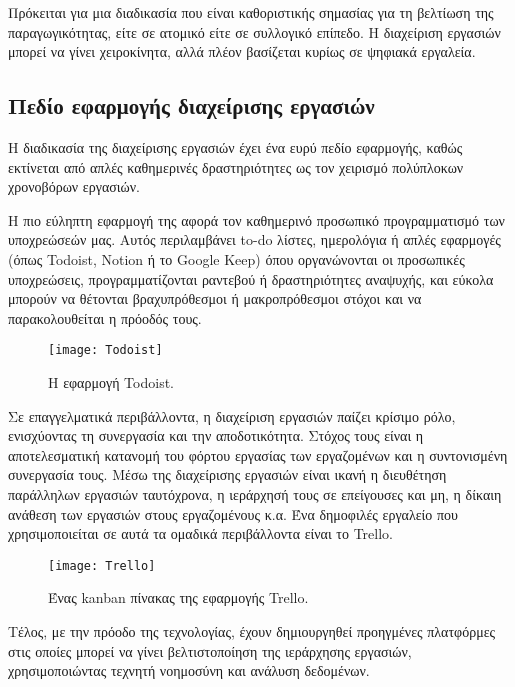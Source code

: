             Πρόκειται για μια διαδικασία που είναι καθοριστικής σημασίας για τη βελτίωση της παραγωγικότητας, είτε σε ατομικό είτε σε συλλογικό επίπεδο. Η διαχείριση εργασιών μπορεί να γίνει χειροκίνητα, αλλά πλέον βασίζεται κυρίως σε ψηφιακά εργαλεία.

        \subsection{Πεδίο εφαρμογής διαχείρισης εργασιών}
            Η διαδικασία της διαχείρισης εργασιών έχει ένα ευρύ πεδίο εφαρμογής, καθώς εκτίνεται από απλές καθημερινές δραστηριότητες ως τον χειρισμό πολύπλοκων χρονοβόρων εργασιών.

            Η πιο εύληπτη εφαρμογή της αφορά τον καθημερινό προσωπικό προγραμματισμό των υποχρεώσεών μας. Αυτός περιλαμβάνει to-do λίστες, ημερολόγια ή απλές εφαρμογές (όπως Todoist, Notion ή το Google Keep) όπου οργανώνονται οι προσωπικές υποχρεώσεις, προγραμματίζονται ραντεβού ή δραστηριότητες αναψυχής, και εύκολα μπορούν να θέτονται βραχυπρόθεσμοι ή μακροπρόθεσμοι στόχοι και να παρακολουθείται η πρόοδός τους. \cite{Todoist} \cite{Notion}

            \begin{figure}[h!] \noindent \centering
                \texttt{[image: Todoist]}
                \caption{Η εφαρμογή Todoist.}
            \end{figure}

            Σε επαγγελματικά περιβάλλοντα, η διαχείριση εργασιών παίζει κρίσιμο ρόλο, ενισχύοντας τη συνεργασία και την αποδοτικότητα. Στόχος τους είναι η αποτελεσματική κατανομή του φόρτου εργασίας των εργαζομένων και η συντονισμένη συνεργασία τους. Μέσω της διαχείρισης εργασιών είναι ικανή η διευθέτηση παράλληλων εργασιών ταυτόχρονα, η ιεράρχησή τους σε επείγουσες και μη, η δίκαιη ανάθεση των εργασιών στους εργαζομένους κ.α. Ένα δημοφιλές εργαλείο που χρησιμοποιείται σε αυτά τα ομαδικά περιβάλλοντα είναι το Trello. \cite{Trello}

            \begin{figure}[h!] \noindent \centering
                \texttt{[image: Trello]}
                \caption{Ένας kanban πίνακας της εφαρμογής Trello.}
            \end{figure}

            Τέλος, με την πρόοδο της τεχνολογίας, έχουν δημιουργηθεί προηγμένες πλατφόρμες στις οποίες μπορεί να γίνει βελτιστοποίηση της ιεράρχησης εργασιών, χρησιμοποιώντας τεχνητή νοημοσύνη και ανάλυση δεδομένων.

